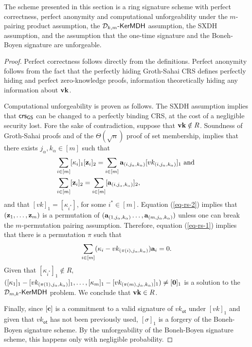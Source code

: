 \begin{theorem}
The scheme presented in this section is a ring signature scheme
with perfect correctness, perfect anonymity and computational unforgeability under the
$m$-pairing product assumption, the $\mathcal{D}_{k,m}\mbox{-}\mathsf{KerMDH}$ assumption, the SXDH assumption, and the assumption
that the one-time signature and the Boneh-Boyen signature are unforgeable.
\end{theorem}
\begin{proof}
Perfect correctness follows directly from the definitions. Perfect anonymity follows from the fact that the perfectly hiding Groth-Sahai CRS defines perfectly hiding and perfect zero-knowledge proofs, information theoretically hiding any information about $\mathbf{vk}$.

Computational unforgeability is proven as follows. The SXDH assumption implies that $\mathsf{crs}_{\mathsf{GS}}$ can be changed to a perfectly binding CRS, at the cost of a negligible security lost. Fore the sake of contradiction, suppose that $\mathbf{vk}\notin R$. Soundness of Groth-Sahai proofs and of the $\Theta(\sqrt{n})$ proof of set membership, implies that there exists $j_\alpha,k_\alpha\in[m]$ such that
\begin{align}
&\sum_{i\in[m]}[\kappa_i]_1[\mathbf{z}_i]_2=\sum_{i\in[m]}\mathbf{a}_{(i,j_\alpha,k_\alpha)}[vk_{(i,j_\alpha,k_\alpha)}]_1\text{ and }\label{eq-rs-1}\\
&\sum_{i\in[m]}[\mathbf{z}_i]_2=\sum_{i\in[m]}[\mathbf{a}_{(i,j_\alpha,k_\alpha)}]_2, \label{eq-rs-2}
\end{align}
and that $[vk]_1=[\kappa_{i^*}]$, for some $i^*\in[m]$. Equation (\ref{eq-rs-2}) implies that $(\mathbf{z}_1,\ldots,\mathbf{z}_m)$ is a permutation of $(\mathbf{a}_{(1,j_\alpha,k_\alpha)}\ldots,\mathbf{a}_{(m,j_\alpha,k_\alpha)})$ unless one can break the $m$-permutation pairing assumption. Therefore, equation (\ref{eq-rs-1}) implies that there is a permutation $\pi$ such that
\begin{align}
\sum_{i\in[m]}(\kappa_i-vk_{(\pi(i),j_\alpha,k_\alpha)})\mathbf{a}_i=0.
\end{align}
Given that $[\kappa_{i^*}]_1\notin R$, $([\kappa_1]_1-[vk_{(\pi(1),j_\alpha,k_\alpha)}]_1,\ldots,[\kappa_m]_1-[vk_{(\pi(m),j_\alpha,k_\alpha)}]_1)\neq [\mathbf{0}]_1$ is a solution to the $\mathcal{D}_{m,k}\mbox{-}\mathsf{KerMDH}$ problem. We conclude that $\mathbf{vk}\in R$.

Finally, since $[\mathbf{c}]$ is a commitment to a valid signature of $vk_\mathsf{ot}$ under $[vk]_1$ and given that $vk_\mathsf{ot}$ has not been previously used, $[\sigma]_1$ is a forgery of the Boneh-Boyen signature scheme. By the unforgeability of the Boneh-Boyen signature scheme, this happens only with negligible probability.
\end{proof}
